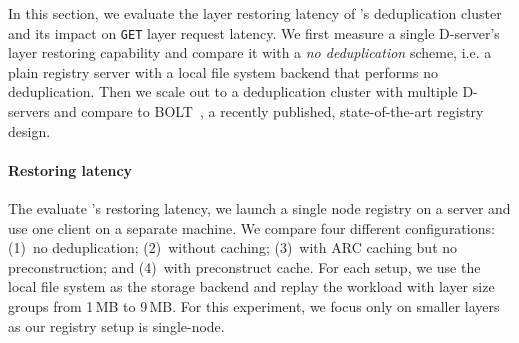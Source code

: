 In this section, we evaluate the layer restoring latency of \sysname's deduplication cluster 
and its impact on \texttt{GET} layer request latency.
%
We first measure a single D-server's layer restoring capability and compare it with 
a \emph{no deduplication} scheme, i.e.  a plain registry server with a local file system backend
that performs no deduplication.
%
Then we scale out to a deduplication cluster with multiple D-servers and compare
\sysname to BOLT~\cite{littley2019bolt}, a recently published, state-of-the-art registry design.
%
%
%

\paragraph{Restoring latency}
%
%
The evaluate \sysname{}'s restoring latency, we launch a single node registry on a server
and use one client on a separate machine.
%
We compare four different configurations:
(1)~no deduplication;
(2)~\sysname without caching;
(3)~\sysname with ARC caching but no preconstruction; and
(4)~\sysname with preconstruct cache.
%
For each setup, we use the local file system as the storage backend and replay the
\dal workload with layer size groups from 1\,MB to 9\,MB. For this experiment, we focus
only on smaller layers as our registry setup is single-node.
%
%

